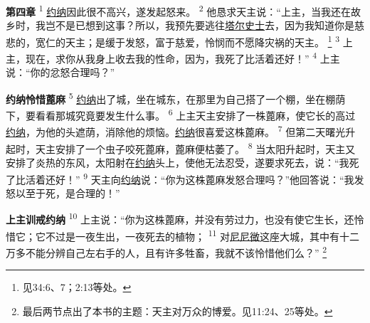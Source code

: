 \textbf{第四章\quad}
\textsuperscript{1}
\uline{约纳}因此很不高兴，遂发起怒来。
\textsuperscript{2}
他恳求天主说：“上主，当我还在故乡时，我岂不是已想到这事？所以，我预先要逃往\uline{塔尔史士}去，因为我知道你是慈悲的，宽仁的天主；是缓于发怒，富于慈爱，怜悯而不愿降灾祸的天主。
\footnote{见34:6、7；2:13等处。}
\textsuperscript{3}
上主，现在，求你从我身上收去我的性命，因为，我死了比活着还好！”
\textsuperscript{4}
上主说：“你的忿怒合理吗？”

\textbf{约纳怜惜蓖麻\quad}
\textsuperscript{5}
\uline{约纳}出了城，坐在城东，在那里为自己搭了一个棚，坐在棚荫下，要看看那城究竟要发生什么事。
\textsuperscript{6}
上主天主安排了一株蓖麻，使它长的高过\uline{约纳}，为他的头遮荫，消除他的烦恼。\uline{约纳}很喜爱这株蓖麻。
\textsuperscript{7}
但第二天曙光升起时，天主安排了一个虫子咬死蓖麻，蓖麻便枯萎了。
\textsuperscript{8}
当太阳升起时，天主又安排了炎热的东风，太阳射在\uline{约纳}头上，使他无法忍受，遂要求死去，说：“我死了比活着还好！”
\textsuperscript{9}
天主向\uline{约纳}说：“你为这株蓖麻发怒合理吗？”他回答说：“我发怒以至于死，是合理的！”

\textbf{上主训戒约纳\quad}
\textsuperscript{10}
上主说：“你为这株蓖麻，并没有劳过力，也没有使它生长，还怜惜它；它不过是一夜生出，一夜死去的植物；
\textsuperscript{11}
对\uline{尼尼微}这座大城，其中有十二万多不能分辨自己左右手的人，且有许多牲畜，我就不该怜惜他们么？”
\footnote{最后两节点出了本书的主题：天主对万众的博爱。见11:24、25等处。}